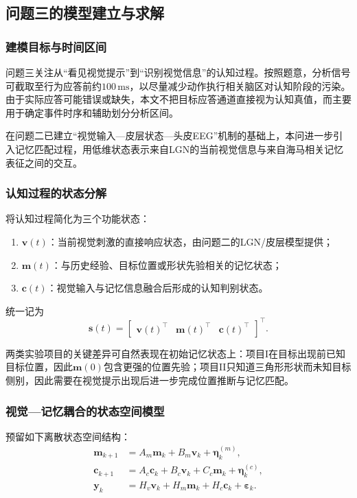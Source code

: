 \subsection{问题三的模型建立与求解}

\subsubsection{建模目标与时间区间}

问题三关注从“看见视觉提示”到“识别视觉信息”的认知过程。按照题意，分析信号可截取至行为应答前约$100\,\mathrm{ms}$，以尽量减少动作执行相关脑区对认知阶段的污染。由于实际应答可能错误或缺失，本文不把目标应答通道直接视为认知真值，而主要用于确定事件时序和辅助划分分析区间。

在问题二已建立“视觉输入—皮层状态—头皮EEG”机制的基础上，本问进一步引入记忆匹配过程，用低维状态表示来自LGN的当前视觉信息与来自海马相关记忆表征之间的交互。

\subsubsection{认知过程的状态分解}

将认知过程简化为三个功能状态：
\begin{enumerate}[label=(\arabic*)]
    \item $\bm v(t)$：当前视觉刺激的直接响应状态，由问题二的LGN/皮层模型提供；
    \item $\bm m(t)$：与历史经验、目标位置或形状先验相关的记忆状态；
    \item $\bm c(t)$：视觉输入与记忆信息融合后形成的认知判别状态。
\end{enumerate}

统一记为
\[
\bm s(t)=
\begin{bmatrix}
\bm v(t)^\top&
\bm m(t)^\top&
\bm c(t)^\top
\end{bmatrix}^{\top}.
\]

两类实验项目的关键差异可自然表现在初始记忆状态上：项目I在目标出现前已知目标位置，因此$\bm m(0)$包含更强的位置先验；项目II只知道三角形形状而未知目标侧别，因此需要在视觉提示出现后进一步完成位置推断与记忆匹配。

\subsubsection{视觉—记忆耦合的状态空间模型}

预留如下离散状态空间结构：
\begin{align}
\bm m_{k+1}
&=
A_m\bm m_k
+B_m\bm v_k
+\bm\eta^{(m)}_k,\\
\bm c_{k+1}
&=
A_c\bm c_k
+B_c\bm v_k
+C_c\bm m_k
+\bm\eta^{(c)}_k,\\
\bm y_k
&=
H_v\bm v_k
+H_m\bm m_k
+H_c\bm c_k
+\bm\varepsilon_k.
\label{eq:q3_state_space}
\end{align}

